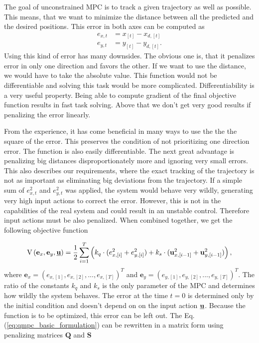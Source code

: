 \documentclass[a4paper,11pt,titlepage]{article}
\newcommand{\uvec}{\textbf{\underline{u}}}
\begin{document}
The goal of unconstrained MPC is to track a given trajectory as well as possible. This means, that we want to minimize the distance between all the predicted and the desired positions. This error in both axes can be computed as
\begin{equation}
\begin{split}
\label{eq:simple_err}
e_{x, t} &= x_{[t]} - x_{d, [t]}\\
e_{y, t} &= y_{[t]} - y_{d, [t]}.
\end{split}
\end{equation}
Using this kind of error has many downsides. The obvious one is, that it penalizes error in only one direction and favors the other. If we want to use the distance, we would have to take the absolute value. This function would not be differentiable \cite{stein1970singular} and solving this task would be more complicated. Differentiability is a very useful property. Being able to compute gradient of the final objective function results in fast task solving. Above that we don't get very good results if penalizing the error linearly. 

From the experience, it has come beneficial in many ways to use the the the square of the error. This preserves the condition of not prioritizing one direction error. The function is also easily differentiable. The next great advantage is penalizing big distances disproportionately more and ignoring very small errors. This also describes our requirements, where the exact tracking of the trajectory is not as important as eliminating big deviations from the trajectory. If a simple sum of $e_{x, t}^2$ and $e_{y, t}^2$ was applied, the system would behave very wildly, generating very high input actions to correct the error. However, this is not in the capabilities of the real system and could result in an unstable control. Therefore input actions must be also penalized. When combined together, we get the following objective function 

\begin{equation}
\label{eq:qmpc_basic_formulation}
\mathrm{V}\left(\textbf{e}_x, \textbf{e}_y, \uvec\right) 
= \frac{1}{2}\sum_{i=1}^{T}\left( k_q \cdot (e^2_{x, [i]}+e^2_{y, [i]}) + k_s \cdot (\textbf{u}^2_{x, [i-1]}+\textbf{u}^2_{y, [i-1]})\right),
\end{equation}
where $\textbf{e}_x = (e_{x, [1]}, e_{x, [2]}, ..., e_{x, [T]})^T$ and $\textbf{e}_y = (e_{y, [1]}, e_{y, [2]}, ..., e_{y, [T]})^T$. The ratio of the constants $k_q$ and $k_s$ is the only parameter of the MPC and determines how wildly the system behaves. The error at the time $t = 0$ is determined only by the initial condition and doesn't depend on on the input action $\uvec$. Because the function is to be optimized, this error can be left out. The Eq. (\ref{eq:qmpc_basic_formulation}) can be rewritten in a matrix form using penalizing matrices $\textbf{Q}$ and $\textbf{S}$
\end{document}
